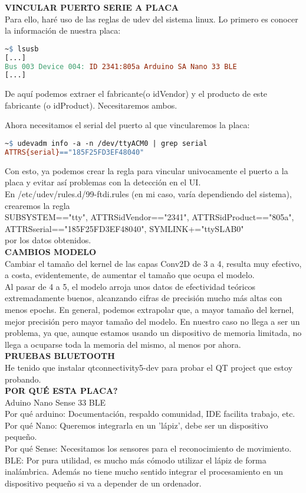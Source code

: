\textbf{VINCULAR PUERTO SERIE A PLACA}\\
Para ello, haré uso de las reglas de udev del sistema linux.
Lo primero es conocer la información de nuestra placa:
\begin{lstlisting}[language=make]
  ~$ lsusb
[...]
Bus 003 Device 004: ID 2341:805a Arduino SA Nano 33 BLE
[...]
\end{lstlisting}
De aquí podemos extraer el fabricante(o idVendor) y el producto de este fabricante
(o idProduct). Necesitaremos ambos.

Ahora necesitamos el serial del puerto al que vincularemos la placa:
\begin{lstlisting}[language=make]
  ~$ udevadm info -a -n /dev/ttyACM0 | grep serial
ATTRS{serial}=="185F25FD3EF48040"
\end{lstlisting}
Con esto, ya podemos crear la regla para vincular univocamente el puerto a la placa
y evitar así problemas con la detección en el UI.\\
En /etc/udev/rules.d/99-ftdi.rules (en mi caso, varía dependiendo del sistema),
crearemos la regla \\SUBSYSTEM=="tty", ATTRS{idVendor}=="2341", ATTRS{idProduct}=="805a",
ATTRS{serial}=="185F25FD3EF48040", SYMLINK+="ttySLAB0"\\por los datos obtenidos.\\

\textbf{CAMBIOS MODELO}\\
Cambiar el tamaño del kernel de las capas Conv2D de 3 a 4, resulta muy efectivo,
a costa, evidentemente, de aumentar el tamaño que ocupa el modelo.\\
Al pasar de 4 a 5, el modelo arroja unos datos de efectividad teóricos extremadamente
buenos, alcanzando cifras de precisión mucho más altas con menos epochs.
En general, podemos extrapolar que, a mayor tamaño del kernel, mejor precisión pero
mayor tamaño del modelo. En nuestro caso no llega a ser un problema, ya que, aunque
estamos usando un dispositivo de memoria limitada, no llega a ocuparse toda la memoria
del mismo, al menos por ahora.\\

\textbf{PRUEBAS BLUETOOTH}\\
He tenido que instalar qtconnectivity5-dev para probar el QT project que estoy probando.\\

\textbf{POR QUÉ ESTA PLACA?}\\
Aduino Nano Sense 33 BLE\\
Por qué arduino: Documentación, respaldo comunidad, IDE facilita trabajo, etc.\\
Por qué Nano: Queremos integrarla en un 'lápiz', debe ser un dispositivo pequeño.\\
Por qué Sense: Necesitamos los sensores para el reconocimiento de movimiento.\\
BLE: Por pura utilidad, es mucho más cómodo utilizar el lápiz de forma inalámbrica.
Además no tiene mucho sentido integrar el procesamiento en un dispositivo pequeño
si va a depender de un ordenador.\\

